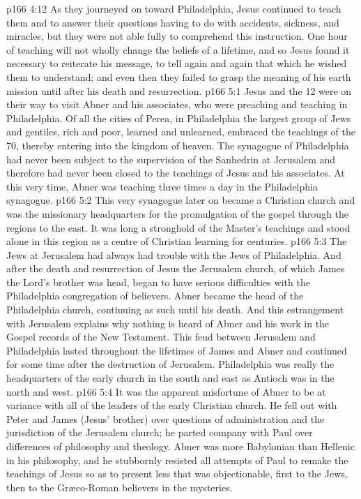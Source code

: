 \vs p166 4:12 \pc As they journeyed on toward Philadelphia, Jesus continued to teach them and to answer their questions having to do with accidents, sickness, and miracles, but they were not able fully to comprehend this instruction. One hour of teaching will not wholly change the beliefs of a lifetime, and so Jesus found it necessary to reiterate his message, to tell again and again that which he wished them to understand; and even then they failed to grasp the meaning of his earth mission until after his death and resurrection.
\vs p166 5:1 Jesus and the 12 were on their way to visit Abner and his associates, who were preaching and teaching in Philadelphia. Of all the cities of Perea, in Philadelphia the largest group of Jews and gentiles, rich and poor, learned and unlearned, embraced the teachings of the 70, thereby entering into the kingdom of heaven. The synagogue of Philadelphia had never been subject to the supervision of the Sanhedrin at Jerusalem and therefore had never been closed to the teachings of Jesus and his associates. At this very time, Abner was teaching three times a day in the Philadelphia synagogue.
\vs p166 5:2 This very synagogue later on became a Christian church and was the missionary headquarters for the promulgation of the gospel through the regions to the east. It was long a stronghold of the Master’s teachings and stood alone in this region as a centre of Christian learning for centuries.
\vs p166 5:3 The Jews at Jerusalem had always had trouble with the Jews of Philadelphia. And after the death and resurrection of Jesus the Jerusalem church, of which James the Lord’s brother was head, began to have serious difficulties with the Philadelphia congregation of believers. Abner became the head of the Philadelphia church, continuing as such until his death. And this estrangement with Jerusalem explains why nothing is heard of Abner and his work in the Gospel records of the New Testament. This feud between Jerusalem and Philadelphia lasted throughout the lifetimes of James and Abner and continued for some time after the destruction of Jerusalem. Philadelphia was really the headquarters of the early church in the south and east as Antioch was in the north and west.
\vs p166 5:4 \pc It was the apparent misfortune of Abner to be at variance with all of the leaders of the early Christian church. He fell out with Peter and James (Jesus’ brother) over questions of administration and the jurisdiction of the Jerusalem church; he parted company with Paul over differences of philosophy and theology. Abner was more Babylonian than Hellenic in his philosophy, and he stubbornly resisted all attempts of Paul to remake the teachings of Jesus so as to present less that was objectionable, first to the Jews, then to the Gr\ae co\hyp{}Roman believers in the mysteries.

